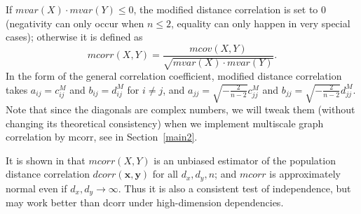 \documentclass[11pt]{article}
\providecommand{\mb}[1]{\boldsymbol{#1}}
\begin{document}
If $mvar(X) \cdot mvar(Y) \leq 0$, the modified distance correlation is set to $0$ (negativity can only occur when $n\leq 2$, equality can only happen in very special cases); otherwise it is defined as
\begin{equation}
\label{mcorrEqu}
mcorr(X,Y)=\frac{mcov(X,Y)}{\sqrt{mvar(X) \cdot mvar(Y)}}.
\end{equation}
In the form of the general correlation coefficient, modified distance correlation takes $a_{ij}=c^{M}_{ij}$ and $b_{ij}=d^{M}_{ij}$ for $i \neq j$, and $a_{jj}=\sqrt{-\frac{2}{n-2}}c^{M}_{jj}$ and $b_{jj}=\sqrt{-\frac{2}{n-2}}d^{M}_{jj}$. Note that since the diagonals are complex numbers, we will tweak them (without changing its theoretical consistency) when we implement multiscale graph correlation by mcorr, see in Section~\ref{main2}.

It is shown in \cite{SzekelyRizzo2013a} that $mcorr(X,Y)$ is an unbiased estimator of the population distance correlation $dcorr(\mb{x},\mb{y})$ for all $d_{x}, d_{y}, n$; and $mcorr$ is approximately normal even if $d_{x},d_{y} \rightarrow \infty$. Thus it is also a consistent test of independence, but may work better than dcorr under high-dimension dependencies. 

\end{document}
